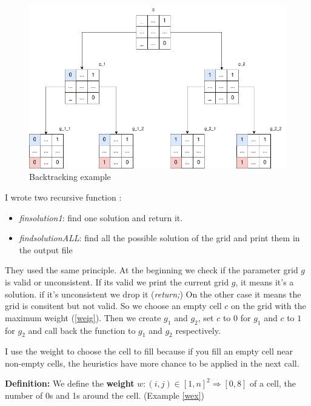 \documentclass[a4paper,12pt]{article}
\newenvironment{definition}[0]%
{\par\textbf{Definition: }}%
{\par}
\begin{document}
\begin{figure}
    \centering
    \includegraphics[scale=0.5]{img/tree.drawio.png}
    \caption{Backtracking example}\label{backtrack}
\end{figure}

I wrote two recursive function :
\begin{itemize}
    \item \textit{finsolution1}: find one solution and return it.
    \item \textit{findsolutionALL}: find all the possible solution of the grid and print them in the output file
\end{itemize}

They used the same principle. At the beginning we check if the parameter grid $g$ is valid or unconsistent. If its valid we print the current grid $g$, it means it's a solution. if it's unconsistent we drop it (\textit{return;})
On the other case it means the grid is consitent but not valid. 
So we choose an empty cell $c$ on the grid with the maximum weight (\ref{weig}). Then we create $g_1$ and $g_2$,
set $c$ to $0$ for $g_1$ and $c$ to $1$ for $g_2$ and call back the function to $g_1$ and $g_2$ respectively.

I use the weight to choose the cell to fill because if you fill an empty cell near non-empty cells, the heuristics have more chance to be applied in the next call.


\begin{definition}
    We define the \textbf{weight} $w: (i,j) \in [1,n]^2 \Longrightarrow [0,8]$ of a cell, the number of 0s and 1s around the cell. (Example \ref{wex})
\end{definition}\label{weig}
\end{document}
